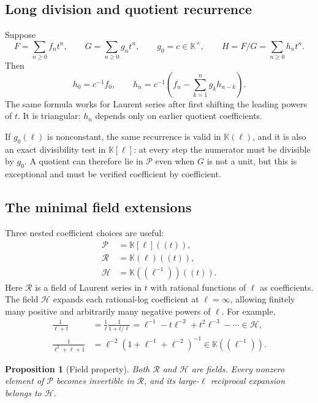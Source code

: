 \documentclass[11pt,oneside]{article}
\numberwithin{equation}{section}
\newtheorem{proposition}[theorem]{Proposition}
\theoremstyle{definition}
\newcommand{\K}{\mathbb K}
\newcommand{\PL}{\mathscr P}
\newcommand{\RL}{\mathscr R}
\newcommand{\HL}{\mathscr H}
\begin{document}
\subsection{Long division and quotient recurrence}

Suppose
\[
 F=\sum_{n\ge0}f_n t^n,
 \qquad G=\sum_{n\ge0}g_n t^n,
 \qquad g_0=c\in\K^\times,
 \qquad H=F/G=\sum_{n\ge0}h_n t^n.
\]
Then
\begin{equation}\label{eq:quotient-recurrence}
  h_0=c^{-1}f_0,
  \qquad
  h_n=c^{-1}\left(f_n-\sum_{k=1}^{n}g_kh_{n-k}\right).
\end{equation}
The same formula works for Laurent series after first shifting the leading
powers of \(t\).  It is triangular: \(h_n\) depends only on earlier quotient
coefficients.

If \(g_0(\ell)\) is nonconstant, the same recurrence is valid in
\(\K(\ell)\), and it is also an exact divisibility test in \(\K[\ell]\): at every
step the numerator must be divisible by \(g_0\).  A quotient can therefore lie in
\(\PL\) even when \(G\) is not a unit, but this is exceptional and must be
verified coefficient by coefficient.

\subsection{The minimal field extensions}\label{subsec:field-extensions}

Three nested coefficient choices are useful:
\begin{align}
 \PL&=\K[\ell]((t)),\label{eq:ring-hierarchy-a}\\
 \RL&=\K(\ell)((t)),\label{eq:ring-hierarchy-b}\\
 \HL&=\K((\ell^{-1}))((t)).\label{eq:ring-hierarchy-c}
\end{align}
Here \(\RL\) is a field of Laurent series in \(t\) with rational functions of
\(\ell\) as coefficients.  The field \(\HL\) expands each rational-log
coefficient at \(\ell=\infty\), allowing finitely many positive and arbitrarily
many negative powers of \(\ell\).  For example,
\begin{align*}
  \frac{1}{\ell+t}
  &=\frac1\ell\frac{1}{1+t/\ell}
    =\ell^{-1}-t\ell^{-2}+t^2\ell^{-3}-\cdots\in\HL,\\
  \frac{1}{\ell^2+\ell+1}
  &=\ell^{-2}\left(1+\ell^{-1}+\ell^{-2}\right)^{-1}
    \in\K((\ell^{-1})).
\end{align*}

\begin{proposition}[Field property]
Both \(\RL\) and \(\HL\) are fields.  Every nonzero element of \(\PL\) becomes
invertible in \(\RL\), and its large-\(\ell\) reciprocal expansion belongs to
\(\HL\).
\end{proposition}
\end{document}
